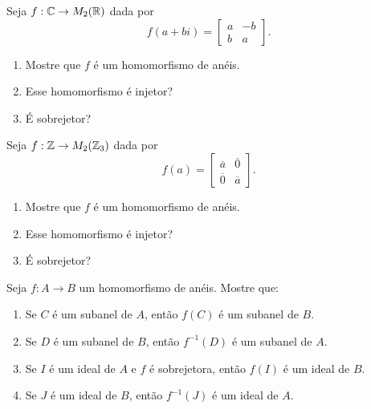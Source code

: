 \documentclass[12pt]{exam}
\begin{document}
    \vspace{.3cm}

    \questao{} Seja $f : \mathbb{C} \to M_2(\mathbb{R})$ dada por
    \[
        f(a + bi) = \begin{bmatrix}
            a & -b\\
            b & a
        \end{bmatrix}.
    \]
    \begin{enumerate}[label=({\alph*})]
        \item Mostre que $f$ \'e um homomorfismo de an\'eis.

        \item Esse homomorfismo \'e injetor?

        \item \'E sobrejetor?
    \end{enumerate}

    \vspace{.3cm}

    \questao{} Seja $f : \mathbb{Z} \to M_2(\mathbb{Z}_3)$ dada por
    \[
        f(a) = \begin{bmatrix}
            \overline{a} & \overline{0}\\
            \overline{0} & \overline{a}
        \end{bmatrix}.
    \]
    \begin{enumerate}[label=({\alph*})]
        \item Mostre que $f$ \'e um homomorfismo de an\'eis.

        \item Esse homomorfismo \'e injetor?

        \item \'E sobrejetor?
    \end{enumerate}

    \vspace{.3cm}

    \questao{} Seja $f: A \to B$ um homomorfismo de an{\'e}is. Mostre que:
    \begin{enumerate}[label=({\alph*})]
        \item Se $C$  {\'e} um subanel de $A$, ent{\~a}o $f(C)$ {\'e} um subanel de $B$.

        \item Se $D$ {\'e} um subanel de $B$, ent{\~a}o $f^{-1}(D)$ {\'e} um subanel de $A$.

        \item Se $I$ {\'e} um ideal de $A$ e $f$ \'e sobrejetora, ent{\~a}o $f(I)$ {\'e} um ideal de $B$.

        \item Se $J$ {\'e} um ideal de $B$, ent{\~a}o $f^{-1}(J)$ {\'e} um ideal de $A$.
    \end{enumerate}
\end{document}
